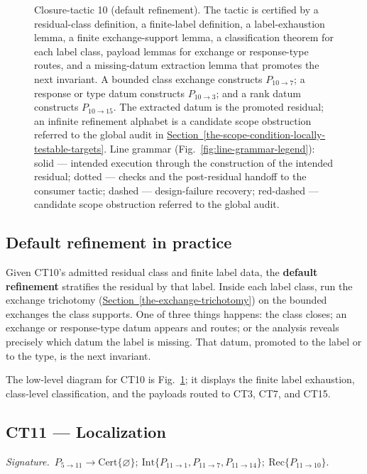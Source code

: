 \documentclass[
  11pt,
]{article}
\theoremstyle{definition}
\newcommand{\secref}[1]{\hyperref[#1]{Section~\ref*{#1}}}
\newcommand{\ctsignature}[1]{\par\noindent\emph{Signature.}\ #1\par\medskip}
\newcommand{\ctcert}[1]{\mathrm{Cert}\{#1\}}
\newcommand{\ctint}[1]{\mathrm{Int}\{#1\}}
\newcommand{\ctrec}[1]{\mathrm{Rec}\{#1\}}
\newcommand{\ctnone}{\varnothing}
\begin{document}
\begin{figure}[p]
\caption[Closure-tactic 10: default refinement]{Closure-tactic 10 (default refinement).  The tactic is certified by a residual-class definition, a finite-label definition, a label-exhaustion lemma, a finite exchange-support lemma, a classification theorem for each label class, payload lemmas for exchange or response-type routes, and a missing-datum extraction lemma that promotes the next invariant.  A bounded class exchange constructs \(P_{10\to7}\); a response or type datum constructs \(P_{10\to3}\); and a rank datum constructs \(P_{10\to15}\).  The extracted datum is the promoted residual; an infinite refinement alphabet is a candidate scope obstruction referred to the global audit in \secref{the-scope-condition-locally-testable-targets}.  Line grammar (Fig.~\ref{fig:line-grammar-legend}): solid --- intended execution through the construction of the intended residual; dotted --- checks and the post-residual handoff to the consumer tactic; dashed --- design-failure recovery; red-dashed --- candidate scope obstruction referred to the global audit.}
\label{fig:ct10-default-refinement}
\end{figure}
\FloatBarrier

\subsection*{Default refinement in practice}

Given CT10's admitted residual class and finite label data, the
\textbf{default refinement} stratifies the residual by that label. Inside
each label class, run the exchange trichotomy (\secref{the-exchange-trichotomy}) on the bounded
exchanges the class supports. One of three things happens: the class
closes; an exchange or response-type datum appears and routes; or the analysis
reveals precisely which datum the label is missing. That datum, promoted
to the label or to the type, is the next invariant.

The low-level diagram for CT10 is Fig.~\ref{fig:ct10-default-refinement};
it displays the finite label exhaustion, class-level classification,
and the payloads routed to CT3, CT7, and CT15.



\subsection{CT11 --- Localization}\label{ct:11}\label{additivity-and-the-localization-lemma}
\ctsignature{\(P_{5\to11}\to \ctcert{\ctnone};\ \ctint{P_{11\to1},P_{11\to7},P_{11\to14}};\ \ctrec{P_{11\to10}}\).}
\end{document}
